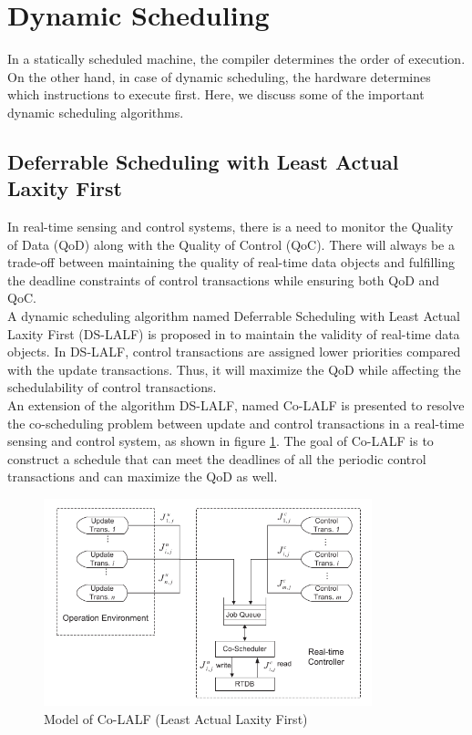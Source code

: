 \documentclass[12pt]{report}
\begin{document}
\section{Dynamic Scheduling}
In a statically scheduled machine, the compiler determines the order of execution. On the other hand, in case of dynamic scheduling, the hardware determines which instructions to execute first. Here, we discuss some of the important dynamic scheduling algorithms. 

\subsection{Deferrable Scheduling with Least Actual Laxity First}
In real-time sensing and control systems, there is a need to monitor the Quality of Data (QoD) along with the Quality of Control (QoC). There will always be a trade-off between maintaining the quality of real-time data objects and fulfilling the deadline constraints of control transactions while ensuring both QoD and QoC.\\

A dynamic scheduling algorithm named Deferrable Scheduling with Least Actual Laxity First (DS-LALF) is proposed in \cite{ds-lalf} to maintain the validity of real-time data objects. In DS-LALF, control transactions are assigned lower priorities compared with the update transactions. Thus, it will maximize the QoD while affecting the schedulability of control transactions. \\     

An extension of the algorithm DS-LALF, named Co-LALF is presented to resolve the co-scheduling problem between update and control transactions in a real-time sensing and control system, as shown in figure \ref{fig:ds}. The goal of Co-LALF is to construct a schedule that can meet the deadlines of all the periodic control transactions and can maximize the QoD as well. 

\begin{figure}[h]
    \centering
    \includegraphics[width=0.85\textwidth]{images/ds-lalf.png}
    \caption[Model of Co-LALF (Least Actual Laxity First)]{Model of Co-LALF (Least Actual Laxity First) \cite{ds-lalf}}
\label{fig:ds}
\end{figure}
\end{document}
